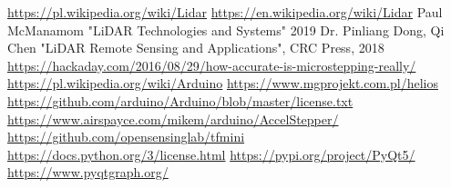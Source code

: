 \documentclass{thesis}
\begin{document}

\newpage
\tableofcontents
\newpage









\begin{thebibliography}{10}
 \url{https://pl.wikipedia.org/wiki/Lidar}
 \url{https://en.wikipedia.org/wiki/Lidar}
 Paul McManamom "LiDAR Technologies and Systems" 2019
 Dr. Pinliang Dong, Qi Chen "LiDAR Remote Sensing and Applications", CRC Press, 2018
 \url{https://hackaday.com/2016/08/29/how-accurate-is-microstepping-really/}
 \url{https://pl.wikipedia.org/wiki/Arduino}
 \url{https://www.mgprojekt.com.pl/helios}
 \url{https://github.com/arduino/Arduino/blob/master/license.txt}
 \url{https://www.airspayce.com/mikem/arduino/AccelStepper/}
 \url{https://github.com/opensensinglab/tfmini}
 \url{https://docs.python.org/3/license.html}
 \url{https://pypi.org/project/PyQt5/}
 \url{https://www.pyqtgraph.org/}
\end{thebibliography}
\listoffigures
\end{document}
